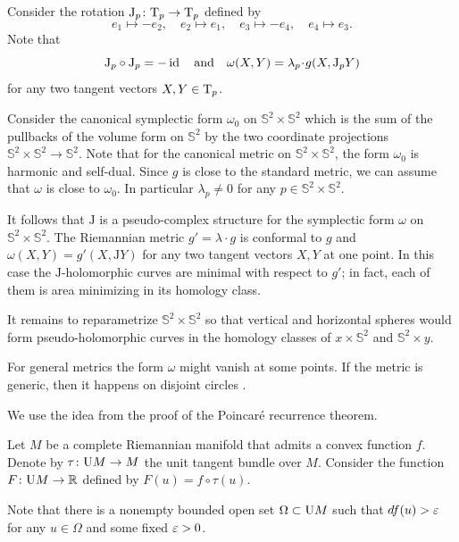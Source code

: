 Consider the rotation $\mathrm{J}_p\colon\mathrm{T}_p\to\mathrm{T}_p$ defined by 
\[ 
e_1\mapsto -e_2,
\quad 
e_2\mapsto e_1,
\quad 
e_3\mapsto -e_4,
\quad 
e_4\mapsto e_3.\]
Note that
\[\mathrm{J}_p\circ\mathrm{J}_p =-\id
\quad\text{and}\quad
\omega(X,Y)=\lambda_p\cdot g(X,\mathrm{J}_pY)\] 
for any two tangent vectors $X,Y\in \mathrm{T}_p$.

Consider the canonical symplectic form $\omega_0$ on $\mathbb{S}^2\times\mathbb{S}^2$ which is the sum of the pullbacks of the volume form on $\mathbb{S}^2$  
by the two coordinate projections $\mathbb{S}^2\times\mathbb{S}^2\to \mathbb{S}^2$.
Note that for the canonical metric on $\mathbb{S}^2\times\mathbb{S}^2$,
the form $\omega_0$ is harmonic and self-dual. 
Since $g$ is close to the standard metric,
we can assume that $\omega$ is close to $\omega_0$.
In particular $\lambda_p\ne0$ for any $p\in \mathbb{S}^2\times\mathbb{S}^2$.

It follows that $\mathrm{J}$ is a pseudo-complex structure for the symplectic form $\omega$ on $\mathbb{S}^2\times\mathbb{S}^2$.
The Riemannian metric $g'=\lambda\cdot g$ is conformal to $g$ and $\omega(X,Y)=g'(X,\mathrm{J} Y)$ 
for any two tangent vectors $X,Y$ at one point.
In this case the $\mathrm{J}$-holomorphic curves are minimal with respect to $g'$;
in fact, each of them is area minimizing in its homology class. 

It remains to reparametrize $\mathbb{S}^2\times \mathbb{S}^2$
so that vertical and horizontal spheres would form pseudo-holomorphic curves in the homology classes of $x\times \mathbb{S}^2$ and $\mathbb{S}^2\times y$.
\qeds
 
 
For general metrics the form $\omega$ might vanish at some points.
If the metric is generic, then it happens on disjoint circles \cite{honda}.







We use the idea from the proof of the Poincar\'e recurrence theorem.

\medskip

Let $M$ be a complete Riemannian manifold that admits a convex function $f$.
Denote by $\tau\colon\mathrm{U} M\to M$ the unit tangent bundle over $M$. 
Consider the function $F\colon\mathrm{U} M\to \mathbb{R}$ defined by $F(u)=f\circ\tau(u)$.

Note that 
there is a nonempty bounded open set $\Omega\subset \mathrm{U} M$
such that $df(u)>\varepsilon$ for any $u\in \Omega$ and some fixed $\varepsilon>0$.

